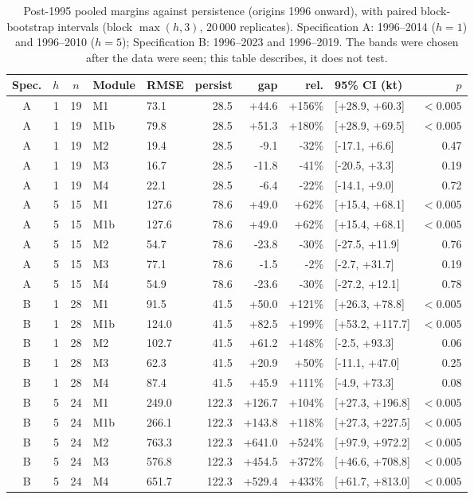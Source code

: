 \documentclass[preprint,11pt,authoryear]{elsarticle}
\theoremstyle{remark}
\begin{document}
\begin{table}[!htb]
\centering\small
\caption{Post-1995 pooled margins against persistence (origins 1996 onward), with paired block-bootstrap intervals (block $\max(h,3)$, 20\,000 replicates). Specification A: 1996--2014 ($h=1$) and 1996--2010 ($h=5$); Specification B: 1996--2023 and 1996--2019. The bands were chosen after the data were seen; this table describes, it does not test.}
\label{tab:si_post1995}
\begin{tabular}{@{}cccllrrrlr@{}}
\toprule
Spec. & $h$ & $n$ & Module & RMSE & persist & gap & rel. & 95\% CI (kt) & $p$ \\
\midrule
A & 1 & 19 & M1 & 73.1 & 28.5 & +44.6 & +156\% & [+28.9, +60.3] & $<0.005$ \\
A & 1 & 19 & M1b & 79.8 & 28.5 & +51.3 & +180\% & [+28.9, +69.5] & $<0.005$ \\
A & 1 & 19 & M2 & 19.4 & 28.5 & -9.1 & -32\% & [-17.1, +6.6] & 0.47 \\
A & 1 & 19 & M3 & 16.7 & 28.5 & -11.8 & -41\% & [-20.5, +3.3] & 0.19 \\
A & 1 & 19 & M4 & 22.1 & 28.5 & -6.4 & -22\% & [-14.1, +9.0] & 0.72 \\
A & 5 & 15 & M1 & 127.6 & 78.6 & +49.0 & +62\% & [+15.4, +68.1] & $<0.005$ \\
A & 5 & 15 & M1b & 127.6 & 78.6 & +49.0 & +62\% & [+15.4, +68.1] & $<0.005$ \\
A & 5 & 15 & M2 & 54.7 & 78.6 & -23.8 & -30\% & [-27.5, +11.9] & 0.76 \\
A & 5 & 15 & M3 & 77.1 & 78.6 & -1.5 & -2\% & [-2.7, +31.7] & 0.19 \\
A & 5 & 15 & M4 & 54.9 & 78.6 & -23.6 & -30\% & [-27.2, +12.1] & 0.78 \\
B & 1 & 28 & M1 & 91.5 & 41.5 & +50.0 & +121\% & [+26.3, +78.8] & $<0.005$ \\
B & 1 & 28 & M1b & 124.0 & 41.5 & +82.5 & +199\% & [+53.2, +117.7] & $<0.005$ \\
B & 1 & 28 & M2 & 102.7 & 41.5 & +61.2 & +148\% & [-2.5, +93.3] & 0.06 \\
B & 1 & 28 & M3 & 62.3 & 41.5 & +20.9 & +50\% & [-11.1, +47.0] & 0.25 \\
B & 1 & 28 & M4 & 87.4 & 41.5 & +45.9 & +111\% & [-4.9, +73.3] & 0.08 \\
B & 5 & 24 & M1 & 249.0 & 122.3 & +126.7 & +104\% & [+27.3, +196.8] & $<0.005$ \\
B & 5 & 24 & M1b & 266.1 & 122.3 & +143.8 & +118\% & [+27.3, +227.5] & $<0.005$ \\
B & 5 & 24 & M2 & 763.3 & 122.3 & +641.0 & +524\% & [+97.9, +972.2] & $<0.005$ \\
B & 5 & 24 & M3 & 576.8 & 122.3 & +454.5 & +372\% & [+46.6, +708.8] & $<0.005$ \\
B & 5 & 24 & M4 & 651.7 & 122.3 & +529.4 & +433\% & [+61.7, +813.0] & $<0.005$ \\
\bottomrule
\end{tabular}
\end{table}
\end{document}
